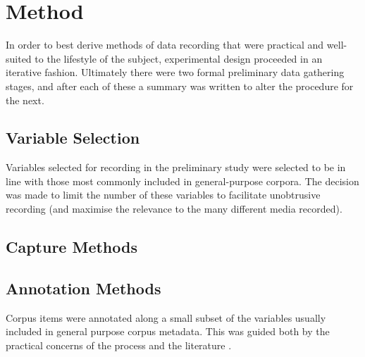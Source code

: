 








\section{Method}
In order to best derive methods of data recording that were practical and well-suited to the lifestyle of the subject, experimental design proceeded in an iterative fashion.  Ultimately there were two formal preliminary data gathering stages, and after each of these a summary was written to alter the procedure for the next.






\subsection{Variable Selection}
Variables selected for recording in the preliminary study were selected to be in line with those most commonly included in general-purpose corpora.  The decision was made to limit the number of these variables to facilitate unobtrusive recording (and maximise the relevance to the many different media recorded).





\subsection{Capture Methods}



\subsection{Annotation Methods}
Corpus items were annotated along a small subset of the variables usually included in general purpose corpus metadata.  This was guided both by the practical concerns of the process and the literature %
.

